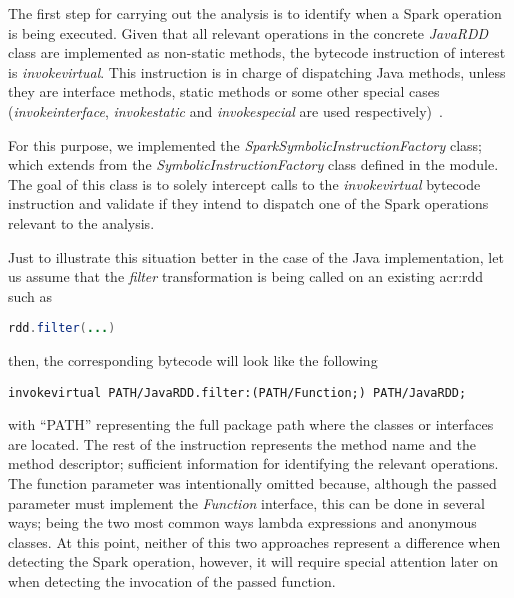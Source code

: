 



The first step for carrying out the analysis is to identify when a Spark operation is being executed. Given that all relevant operations in the concrete \textit{JavaRDD} class are implemented as non-static methods, the bytecode instruction of interest is \textit{invokevirtual}. This instruction is in charge of dispatching Java methods, unless they are interface methods, static methods or some other special cases (\textit{invokeinterface}, \textit{invokestatic} and \textit{invokespecial} are used respectively)~\cite{Lindholm2014}.

For this purpose, we implemented the \textit{SparkSymbolicInstructionFactory} class; which extends from the \textit{SymbolicInstructionFactory} class defined in the \spf module. The goal of this class is to solely intercept calls to the \textit{invokevirtual} bytecode instruction and validate if they intend to dispatch one of the Spark operations relevant to the analysis.

Just to illustrate this situation better in the case of the Java implementation, let us assume that the \textit{filter} transformation is being called on an existing \acrshort{acr:rdd} such as

\hspace*{1cm} \lstinline[language=Java,]|rdd.filter(...)|

then, the corresponding bytecode will look like the following

\hspace*{1cm} \lstinline[]|invokevirtual PATH/JavaRDD.filter:(PATH/Function;) PATH/JavaRDD;|

with ``PATH'' representing the full package path where the classes or interfaces are located. The rest of the instruction represents the method name and the method descriptor; sufficient information for identifying the relevant operations. The function parameter was intentionally omitted because, although the passed parameter must implement the \textit{Function} interface, this can be done in several ways; being the two most common ways lambda expressions and anonymous classes. At this point, neither of this two approaches represent a difference when detecting the Spark operation, however, it will require special attention later on when detecting the invocation of the passed function.

